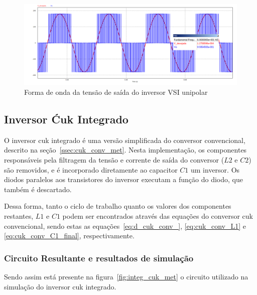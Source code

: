 \documentclass[
	12pt,				%
	openright,			%
	twoside,			%
	a4paper,			%
	english,			%
	french,				%
	spanish,			%
	brazil,				%
	]{abntex2}
\begin{document}
\begin{figure}[H]%
	\centering
		\includegraphics[width= \linewidth]{vsi_uni_out}
		\caption{Forma de onda da tensão de saída do inversor VSI unipolar}
		\label{fig:response_vsi_uni}
\end{figure}

\subsection{Inversor Ćuk Integrado}

O inversor cuk integrado é uma versão simplificada do conversor convencional, descrito na seção~\ref{ssec:cuk_conv_met}. Nesta implementação, os componentes responsáveis pela filtragem da tensão e corrente de saída do conversor ($L2$ e $C2$) são removidos, e é incorporado diretamente ao capacitor $C1$ um inversor. Os diodos paralelos aos transistores do inversor executam a função do diodo, que também é descartado.

Dessa forma, tanto o ciclo de trabalho quanto os valores dos componentes restantes, $L1$ e $C1$ podem ser encontrados através das equações do conversor cuk convencional, sendo estas as equações~\ref{eq:d_cuk_conv_}, \ref{eq:cuk_conv_L1} e \ref{eq:cuk_conv_C1_final}, respectivamente.

\subsubsection{Circuito Resultante e resultados de simulação}

Sendo assim está presente na figura~\ref{fig:integ_cuk_met} o circuito utilizado na simulação do inversor cuk integrado.
\end{document}
